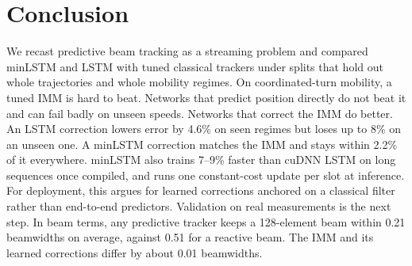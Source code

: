 \documentclass[conference]{IEEEtran}
\begin{document}
\section{Conclusion}
We recast predictive beam tracking as a streaming problem and compared minLSTM
and LSTM with tuned classical trackers under splits that hold out whole
trajectories and whole mobility regimes. On coordinated-turn mobility, a tuned
IMM is hard to beat. Networks that predict position directly do not beat it
and can fail badly on unseen speeds. Networks that correct the IMM do better.
An LSTM correction lowers error by 4.6\% on seen regimes but loses up to 8\%
on an unseen one. A minLSTM correction matches the IMM and stays within 2.2\%
of it everywhere. minLSTM also trains 7--9\% faster than cuDNN LSTM on long
sequences once compiled, and runs one constant-cost update per slot at
inference. For deployment, this argues for learned corrections anchored on a
classical filter rather than end-to-end predictors. Validation on real
measurements is the next step. In beam terms, any predictive tracker keeps a
128-element beam within 0.21 beamwidths on average, against 0.51 for a
reactive beam. The IMM and its learned corrections differ by about 0.01
beamwidths.



\end{document}
